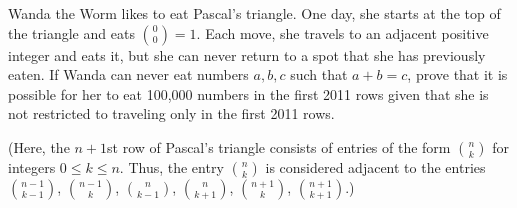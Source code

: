 Wanda the Worm likes to eat Pascal's triangle. One day, she starts at the top of the triangle and eats $\textstyle\binom{0}{0}=1$. Each move, she travels to an adjacent positive integer and eats it, but she can never return to a spot that she has previously eaten. If Wanda can never eat numbers $a,b,c$ such that $a+b=c$, prove that it is possible for her to eat 100,000 numbers in the first 2011 rows given that she is not restricted to traveling only in the first 2011 rows.

(Here, the $n+1$st row of Pascal's triangle consists of entries of the form $\textstyle\binom{n}{k}$ for integers $0\le k\le n$. Thus, the entry $\textstyle\binom{n}{k}$ is considered adjacent to the entries $\textstyle\binom{n-1}{k-1}$, $\textstyle\binom{n-1}{k}$, $\textstyle\binom{n}{k-1}$, $\textstyle\binom{n}{k+1}$, $\textstyle\binom{n+1}{k}$, $\textstyle\binom{n+1}{k+1}$.)